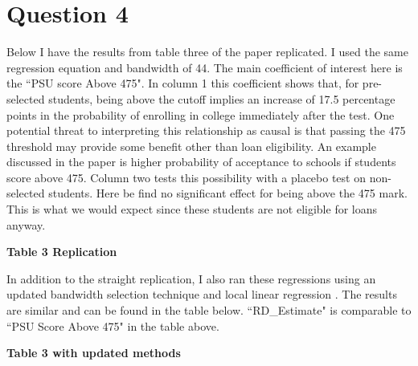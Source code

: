 \documentclass[11pt]{article}
\begin{document}
\section{ Question 4}

Below I have the results from table three of the paper replicated. I used the same regression equation and bandwidth of 44. The main coefficient of interest here is the ``PSU score Above 475". In column 1 this coefficient shows that, for pre-selected students, being above the cutoff implies an increase of 17.5 percentage points in the probability of enrolling in college immediately after the test. One potential threat to interpreting this relationship as causal is that passing the 475 threshold may provide some benefit other than loan eligibility. An example discussed in the paper is higher probability of acceptance to schools if students score above 475. Column two tests this possibility with a placebo test on non-selected students. Here be find no significant effect for being above the 475 mark. This is what we would expect since these students are not eligible for loans anyway. 

\begin{center}
	\textbf{Table 3 Replication}\par\medskip
		

\end{center}


In addition to the straight replication, I also ran these regressions using an updated bandwidth selection technique and local linear regression  \cite{matias_14}. The results are similar and can be found in the table below. ``RD\_Estimate" is comparable to ``PSU Score Above 475" in the table above. 


\begin{center}
		\textbf{Table 3 with updated methods}\par\medskip
	
	
\end{center}




\end{document}
